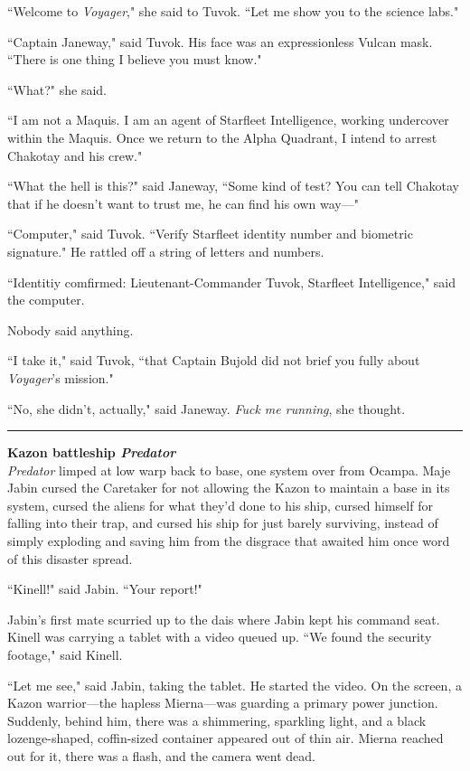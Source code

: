 \documentclass[twoside,letterpaper,12pt]{memoir}
\begin{document}
``Welcome to \textit{Voyager}," she said to Tuvok. ``Let me show you to the science labs."

``Captain Janeway," said Tuvok. His face was an expressionless Vulcan mask. ``There is one thing I believe you must know."

``What?" she said.

``I am not a Maquis. I am an agent of Starfleet Intelligence, working undercover within the Maquis. Once we return to the Alpha Quadrant, I intend to arrest Chakotay and his crew."

``What the hell is this?" said Janeway, ``Some kind of test? You can tell Chakotay that if he doesn't want to trust me, he can find his own way---"

``Computer," said Tuvok. ``Verify Starfleet identity number and biometric signature." He rattled off a string of letters and numbers.

``Identitiy comfirmed: Lieutenant-Commander Tuvok, Starfleet Intelligence," said the computer.

Nobody said anything.

``I take it," said Tuvok, ``that Captain Bujold did not brief you fully about \textit{Voyager}'s mission."

``No, she didn't, actually," said Janeway. \textit{Fuck me running}, she thought.

\fancybreak{\rule{3cm}{0.4 pt}}
\noindent\textbf{Kazon battleship \textit{Predator}}\\

\textit{Predator} limped at low warp back to base, one system over from Ocampa. Maje Jabin cursed the Caretaker for not allowing the Kazon to maintain a base in its system, cursed the aliens for what they'd done to his ship, cursed himself for falling into their trap, and cursed his ship for just barely surviving, instead of simply exploding and saving him from the disgrace that awaited him once word of this disaster spread.

``Kinell!" said Jabin. ``Your report!"

Jabin's first mate scurried up to the dais where Jabin kept his command seat. Kinell was carrying a tablet with a video queued up. ``We found the security footage," said Kinell.

``Let me see," said Jabin, taking the tablet. He started the video. On the screen, a Kazon warrior---the hapless Mierna---was guarding a primary power junction. Suddenly, behind him, there was a shimmering, sparkling light, and a black lozenge-shaped, coffin-sized container appeared out of thin air. Mierna reached out for it, there was a flash, and the camera went dead.
\end{document}
